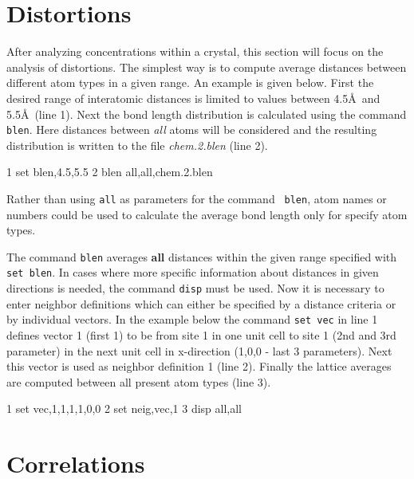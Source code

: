 
\section{Distortions \label{chem-dist}}

After analyzing concentrations within a crystal, this section will
focus on the analysis of distortions. The simplest way is to compute
average distances between different atom types in a given range. An
example is given below. First the desired range of interatomic
distances is limited to values between 4.5\AA \ and 5.5\AA \ (line
1). Next the bond length distribution is calculated using the 
\Discus command {\tt blen}. Here distances between {\it all} atoms
will be considered and the resulting distribution is written to the
file {\it chem.2.blen} (line 2).
%

\begin{MacVerbatim}
     1  set blen,4.5,5.5
     2  blen all,all,chem.2.blen
\end{MacVerbatim}
%
Rather than using {\tt all} as parameters for the command {\tt
blen}, atom names or numbers could be used to calculate the average
bond length only for specify atom types.
\par

The command {\tt blen} averages {\bf all} distances within the given
range specified with {\tt set blen}. In cases where more specific
information about distances in given directions is needed, the
command {\tt disp} must be used. Now it is necessary to enter
neighbor definitions which can either be specified by a distance
criteria or by individual vectors. In the example below the command
{\tt set vec} in line 1 defines vector 1 (first 1) to be from site 1
in one unit cell to site 1 (2nd and 3rd parameter) in the next unit
cell in x-direction (1,0,0 - last 3 parameters). Next this vector is
used as neighbor definition 1 (line 2). Finally the lattice
averages are computed between all present atom types (line 3).
%
\begin{MacVerbatim}
     1  set vec,1,1,1,1,0,0
     2  set neig,vec,1
     3  disp all,all
\end{MacVerbatim}


\section{Correlations \label{chem-corr}}

